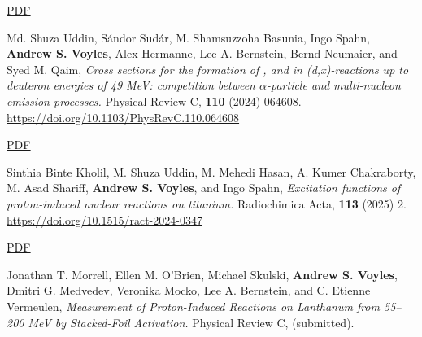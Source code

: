 \begin{bibsection}
\ifshort \vspace{0.1cm} \href{https://avoyles.github.io/papers/Gordon2025_GENESIS.pdf}{\underline{PDF}} \else  \fi

\item Md. Shuza Uddin, Sándor Sudár, M. Shamsuzzoha Basunia, Ingo Spahn, \textbf{Andrew S. Voyles}, Alex Hermanne, Lee A. Bernstein, Bernd Neumaier, and Syed M. Qaim, \emph{Cross sections for the formation of ,  and  in (d,x)-reactions up to deuteron energies of 49 MeV: competition between $\alpha$-particle and multi-nucleon emission processes.} Physical Review C, \textbf{110} (2024) 064608. \url{https://doi.org/10.1103/PhysRevC.110.064608}

\ifshort \vspace{0.1cm} \href{https://avoyles.github.io/papers/Uddin2024_84Rb.pdf}{\underline{PDF}} \else  \fi


\item Sinthia Binte Kholil, M. Shuza Uddin, M. Mehedi Hasan, A. Kumer Chakraborty, M. Asad Shariff, \textbf{Andrew S. Voyles}, and Ingo Spahn, \emph{Excitation functions of proton-induced nuclear reactions on titanium.} Radiochimica Acta, \textbf{113} (2025) 2. \url{https://doi.org/10.1515/ract-2024-0347}

\ifshort \vspace{0.1cm} \href{https://avoyles.github.io/papers/Kholil2024_Ti_px.pdf}{\underline{PDF}} \else  \fi



\item Jonathan T. Morrell, Ellen M. O'Brien, Michael Skulski, \textbf{Andrew S. Voyles}, Dmitri G. Medvedev, Veronika Mocko, Lee A. Bernstein, and C. Etienne Vermeulen, \emph{Measurement of Proton-Induced Reactions on Lanthanum from 55--200 MeV by Stacked-Foil Activation.} Physical Review C, (submitted).





\end{bibsection}
